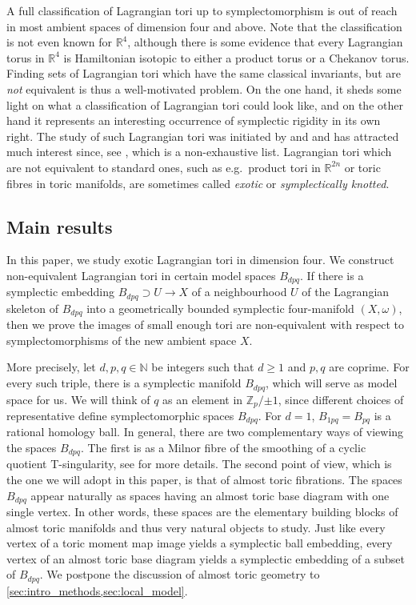 \documentclass[12pt,a4paper,abstract=true,final]{scrartcl}
\begin{document}
A full classification of Lagrangian tori up to symplectomorphism is out of reach in most ambient spaces of dimension four and above.
Note that the classification is not even known for $\mathbb{R}^4$, although there is some evidence \cite{Riz19} that every Lagrangian torus in $\mathbb{R}^4$ is Hamiltonian isotopic to either a product torus or a Chekanov torus.
Finding sets of Lagrangian tori which have the same classical invariants, but are \emph{not} equivalent is thus a well-motivated problem.
On the one hand, it sheds some light on what a classification of Lagrangian tori could look like, and on the other hand it represents an interesting occurrence of symplectic rigidity in its own right.
The study of such Lagrangian tori was initiated by \cite{Che96} and \cite{EliPol97} and has attracted much interest since,  see \cite{Aur15, brendel2020real, CheSch10, FOOO12, GalMik22, SheTonVia19, Via17, Via16} , which is a non-exhaustive list.
Lagrangian tori which are not equivalent to standard ones, such as e.g.\ product tori in $\mathbb{R}^{2n}$ or toric fibres in toric manifolds, are sometimes called \emph{exotic} or \emph{symplectically knotted}.

\subsection{Main results}
\label{sec:intro_main_results}

In this paper, we study exotic Lagrangian tori in dimension four.
We construct non-equivalent Lagrangian tori in certain model spaces $B_{dpq}$. If there is a symplectic embedding $B_{dpq} \supset U \rightarrow X$ of a neighbourhood $U$ of the Lagrangian skeleton of $B_{dpq}$ into a geometrically bounded symplectic four-manifold $(X,\omega)$, then we prove the images of small enough tori are non-equivalent with respect to symplectomorphisms of the new ambient space $X$.

More precisely, let $d,p,q \in \mathbb{N}$ be integers such that $d≥1$ and $p,q$ are coprime.
For every such triple, there is a symplectic manifold $B_{dpq}$, which will serve as model space for us. 
We will think of $q$ as an element in $ℤ_p / {±1}$, since different choices of representative define symplectomorphic spaces $B_{dpq}$.
For $d=1$, $B_{1pq} = B_{pq}$ is a rational homology ball.
In general, there are two complementary ways of viewing the spaces $B_{dpq}$.
The first is as a Milnor fibre of the smoothing of a cyclic quotient T-singularity, see \cite[Section 7.4]{evans2021atfs} for more details.
The second point of view, which is the one we will adopt in this paper, is that of almost toric fibrations.
The spaces $B_{dpq}$ appear naturally as spaces having an almost toric base diagram with one single vertex.
In other words, these spaces are the elementary building blocks of almost toric manifolds and thus very natural objects to study.
Just like every vertex of a toric moment map image yields a symplectic ball embedding, every vertex of an almost toric base diagram yields a symplectic embedding of a subset of $B_{dpq}$.
We postpone the discussion of almost toric geometry to \cref{sec:intro_methods,sec:local_model}. 
\end{document}
